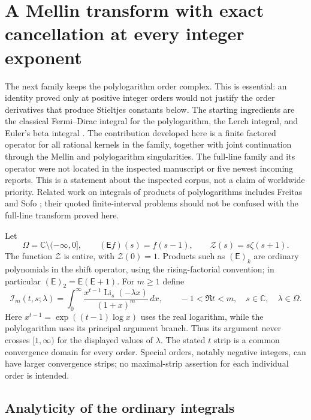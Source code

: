 \documentclass[11pt,letterpaper]{article}
\numberwithin{equation}{section}
\theoremstyle{definition}
\theoremstyle{remark}
\begin{document}


\section{A Mellin transform with exact cancellation at every integer exponent}
\label{mpr:sec:main}

The next family keeps the polylogarithm order complex.  This is essential:
an identity proved only at positive integer orders would not justify the
order derivatives that produce Stieltjes constants below.  The starting
ingredients are the classical Fermi--Dirac integral for the polylogarithm,
the Lerch integral, and Euler's beta integral
\cite{DLMFPolylog,mpr:DLMFLerch,mpr:DLMFbeta}.
The contribution developed here is a finite factored operator for all
rational kernels in the family, together with joint continuation through
the Mellin and polylogarithm singularities.  The full-line family and its
operator were not located in the inspected manuscript or five newest
incoming reports.  This is a statement about the inspected corpus, not a
claim of worldwide priority.  Related work on integrals of products of
polylogarithms includes Freitas and Sofo
\cite{mpr:Freitas,mpr:Sofo}; their quoted finite-interval problems should
not be confused with the full-line transform proved here.

Let
\[
 \Omega=\mathbb C\setminus(-\infty,0],\qquad
 (\mathsf Ef)(s)=f(s-1),\qquad
 \mathscr Z(s)=s\zeta(s+1).
\]
The function $\mathscr Z$ is entire, with $\mathscr Z(0)=1$.
Products such as $(\mathsf E)_k$ are ordinary polynomials in the shift
operator, using the rising-factorial convention; in particular
$(\mathsf E)_2=\mathsf E(\mathsf E+1)$.
For $m\ge1$ define
\begin{equation}\label{mpr:eq:integral}
 \mathcal I_m(t,s;\lambda)
 =\int_0^\infty
       \frac{x^{t-1}\operatorname{Li}_s(-\lambda x)}{(1+x)^m}\,dx,
 \qquad -1<\Re t<m,\quad s\in\mathbb C,\quad\lambda\in\Omega.
\end{equation}
Here $x^{t-1}=\exp((t-1)\log x)$ uses the real logarithm, while the
polylogarithm uses its principal argument branch.  Thus its argument never
crosses $[1,\infty)$ for the displayed values of $\lambda$.
The stated $t$ strip is a common convergence domain for every order.
Special orders, notably negative integers, can have larger convergence
strips; no maximal-strip assertion for each individual order is intended.

\subsection{Analyticity of the ordinary integrals}
\end{document}
